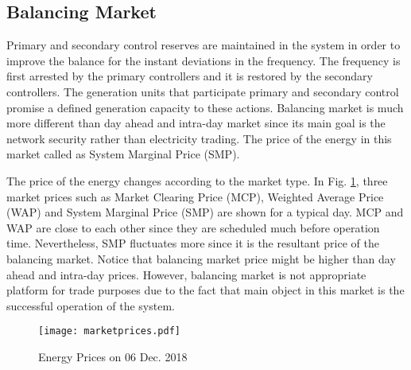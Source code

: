 \subsection{Balancing Market}
Primary and secondary control reserves are maintained in the system in order to improve the balance for the instant deviations in the frequency. The frequency is first arrested by the primary controllers and it is restored by the secondary controllers. The generation units that participate primary and secondary control promise a defined generation capacity to these actions. Balancing market is much more different than day ahead and intra-day market since its main goal is the network security rather than electricity trading. The price of the energy in this market called as System Marginal Price (SMP).\par
The price of the energy changes according to the market type. In Fig. \ref{markets}, three market prices such as Market Clearing Price (MCP), Weighted Average Price (WAP) and System Marginal Price (SMP) are shown for a typical day. MCP and WAP are close to each other since they are scheduled much before operation time. Nevertheless, SMP fluctuates more since it is the resultant price of the balancing market. Notice that balancing market price might be higher than day ahead and intra-day prices. However, balancing market is not appropriate platform for trade purposes due to the fact that main object in this market is the successful operation of the system.
\begin{figure}[h!]
	\centering
	\texttt{[image: marketprices.pdf]}
	\caption{Energy Prices on 06 Dec. 2018 \cite{TEIAS2019}}
	\label{markets}
\end{figure}

